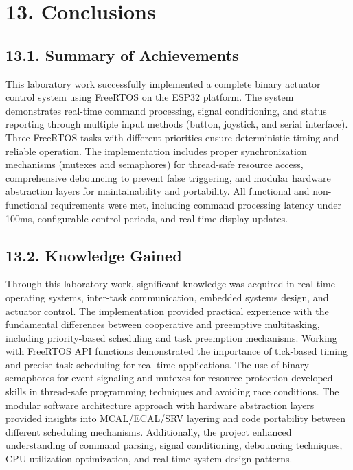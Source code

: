 \documentclass[12pt]{article}
\begin{document}
\section*{13. Conclusions}

\subsection*{13.1. Summary of Achievements}

This laboratory work successfully implemented a complete binary actuator control system using FreeRTOS on the ESP32 platform. The system demonstrates real-time command processing, signal conditioning, and status reporting through multiple input methods (button, joystick, and serial interface). Three FreeRTOS tasks with different priorities ensure deterministic timing and reliable operation. The implementation includes proper synchronization mechanisms (mutexes and semaphores) for thread-safe resource access, comprehensive debouncing to prevent false triggering, and modular hardware abstraction layers for maintainability and portability. All functional and non-functional requirements were met, including command processing latency under 100ms, configurable control periods, and real-time display updates.

\subsection*{13.2. Knowledge Gained}

Through this laboratory work, significant knowledge was acquired in real-time operating systems, inter-task communication, embedded systems design, and actuator control. The implementation provided practical experience with the fundamental differences between cooperative and preemptive multitasking, including priority-based scheduling and task preemption mechanisms. Working with FreeRTOS API functions demonstrated the importance of tick-based timing and precise task scheduling for real-time applications. The use of binary semaphores for event signaling and mutexes for resource protection developed skills in thread-safe programming techniques and avoiding race conditions. The modular software architecture approach with hardware abstraction layers provided insights into MCAL/ECAL/SRV layering and code portability between different scheduling mechanisms. Additionally, the project enhanced understanding of command parsing, signal conditioning, debouncing techniques, CPU utilization optimization, and real-time system design patterns.
\end{document}
